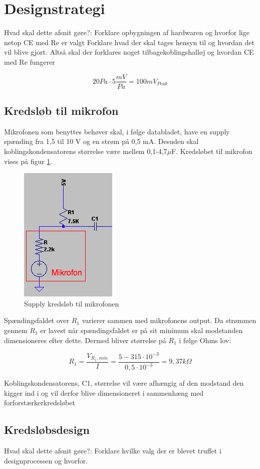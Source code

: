 \section{Designstrategi}
Hvad skal dette afsnit gøre?:
Forklare opbygningen af hardwaren og hvorfor lige netop CE med Re er valgt
Forklare hvad der skal tages hensyn til og hvordan det vil blive gjort.
Altså skal der forklares noget tilbagekoblingshalløj og hvordan CE med Re fungerer

\begin{equation}
20 Pa \cdot 5 \frac{mV}{Pa} = 100 mV_{Peak}
\label{eq:mikrofonoutput}
\end{equation}

\subsection*{Kredsløb til mikrofon}

Mikrofonen som benyttes behøver skal, i følge databladet, have en supply spænding fra 1,5 til 10 V og en strøm på 0,5 mA. Desuden skal koblingskondensatorens størrelse være mellem 0,1-4,7$\mu$F. Kredsløbet til mikrofon vises på figur \ref{fig:mikrofonkreds}. 

\begin{figure}[h]
\centering
\includegraphics[scale=.6]{teknisk/forforstaerker/mikrofonkreds.png}
\caption{Supply kredsløb til mikrofonen}
\label{fig:mikrofonkreds}
\end{figure}

Spændingsfaldet over $R_1$ varierer sammen med mikrofonens output. Da strømmen gennem $R_1$ er lavest når spændingsfaldet er på sit minimum skal modstanden dimensioneres efter dette. Dermed bliver størrelse på $R_1$ i følge Ohms lov:

\begin{equation}
R_1 =  \frac{V_{R_1,min}}{I} = \frac{5-315 \cdot 10^{-3}}{0,5 \cdot 10^{-3}} = 9,37 k\Omega
\end{equation}

Koblingskondensatorens, C1, størrelse vil være afhængig af den modstand den kigger ind i og vil derfor blive dimensioneret i sammenhæng med forforstærkerkredsløbet 

\subsection*{Kredsløbsdesign}

Hvad skal dette afsnit gøre?:
Forklare hvilke valg der er blevet truffet i designprocessen og hvorfor.



